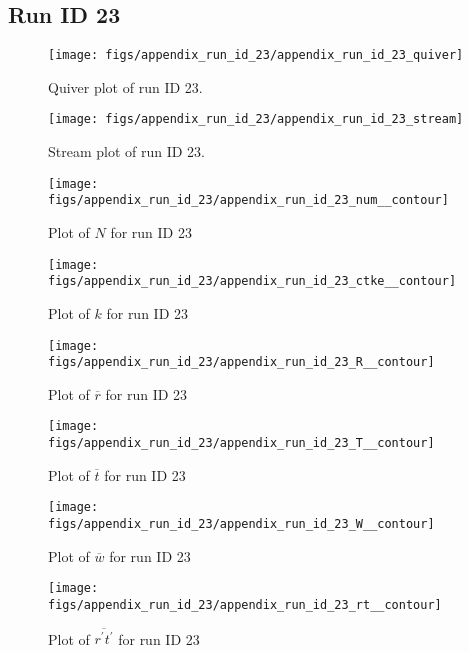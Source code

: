 \subsection{Run ID 23}
\begin{figure}[H]
\centering
\texttt{[image: figs/appendix\_run\_id\_23/appendix\_run\_id\_23\_quiver]}
\caption{Quiver plot of run ID 23.}
\label{fig:appendix_run_id_23_quiver}
\end{figure}


\begin{figure}[H]
\centering
\texttt{[image: figs/appendix\_run\_id\_23/appendix\_run\_id\_23\_stream]}
\caption{Stream plot of run ID 23.}
\label{fig:appendix_run_id_23_stream}
\end{figure}


\begin{figure}[H]
\centering
\texttt{[image: figs/appendix\_run\_id\_23/appendix\_run\_id\_23\_num\_\_contour]}
\caption{Plot of $N$ for run ID 23}
\label{fig:appendix_run_id_23_num__contour}
\end{figure}


\begin{figure}[H]
\centering
\texttt{[image: figs/appendix\_run\_id\_23/appendix\_run\_id\_23\_ctke\_\_contour]}
\caption{Plot of $k$ for run ID 23}
\label{fig:appendix_run_id_23_ctke__contour}
\end{figure}


\begin{figure}[H]
\centering
\texttt{[image: figs/appendix\_run\_id\_23/appendix\_run\_id\_23\_R\_\_contour]}
\caption{Plot of $\overline{r}$ for run ID 23}
\label{fig:appendix_run_id_23_R__contour}
\end{figure}


\begin{figure}[H]
\centering
\texttt{[image: figs/appendix\_run\_id\_23/appendix\_run\_id\_23\_T\_\_contour]}
\caption{Plot of $\overline{t}$ for run ID 23}
\label{fig:appendix_run_id_23_T__contour}
\end{figure}


\begin{figure}[H]
\centering
\texttt{[image: figs/appendix\_run\_id\_23/appendix\_run\_id\_23\_W\_\_contour]}
\caption{Plot of $\overline{w}$ for run ID 23}
\label{fig:appendix_run_id_23_W__contour}
\end{figure}


\begin{figure}[H]
\centering
\texttt{[image: figs/appendix\_run\_id\_23/appendix\_run\_id\_23\_rt\_\_contour]}
\caption{Plot of $\overline{r^\prime t^\prime}$ for run ID 23}
\label{fig:appendix_run_id_23_rt__contour}
\end{figure}



